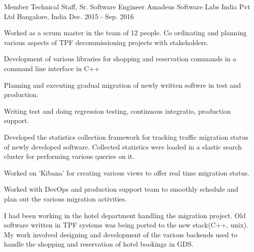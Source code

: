 \begin{cventries}
  \cventrywithsummary
    {Member Technical Staff, Sr. Software Engineer} %
    {Amadeus Software Labs India Pvt Ltd} %
    {Bangalore, India} %
    {Dec. 2015 - Sep. 2016} %
    {
      \begin{cvitems} %
        \item {Worked as a scrum master in the team of 12 people. Co ordinating and planning various aspects of TPF decommissioning projects with stakeholders.}
        \item {Development of various libraries for shopping and reservation commands in a command line interface in C++}
        \item {Planning and executing gradual migration of newly written softwre in test and production.}
        \item {Writing test and doing regression testing, continuous integratio, production support.}
        \item {Developed the statistics collection framework for tracking traffic migration status of newly developed software. Collected statistics were loaded in a elastic search cluster for performing various queries on it.}
        \item {Worked on 'Kibana' for creating various views to offer real time migration status.}
        \item {Worked with DevOps and production support team to smoothly schedule and plan out the various migration activities.}
      \end{cvitems}
    }
    {
      \begin{cvsummary}
        I had been working in the hotel department handling the migration project. Old software written in TPF systems was being ported to the new stack(C++, unix). My work involved designing and development of the various backends used to handle the shopping and reservation of hotel bookings in GDS.
      \end{cvsummary}
    }


\end{cventries}
